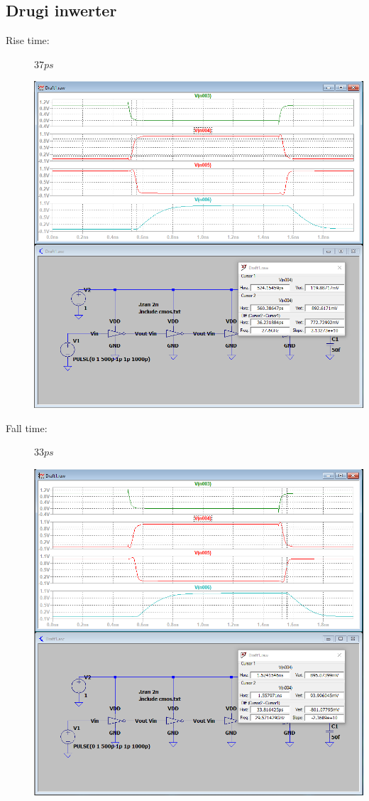 \documentclass[a4paper, 11pt]{article}
\begin{document}
\subsection{Drugi inwerter}
\begin{description}
	\item[Rise time:] $37 ps$ \hfill
	      \begin{center}
		      \includegraphics[scale=0.38]{mikro_lab3/rise_time1.PNG}
	      \end{center}
	\item[Fall time:] $33 ps$ \hfill
	      \begin{center}
		      \includegraphics[scale=0.38]{mikro_lab3/fall_time1.PNG}

\end{center}
\end{description}
\end{document}
